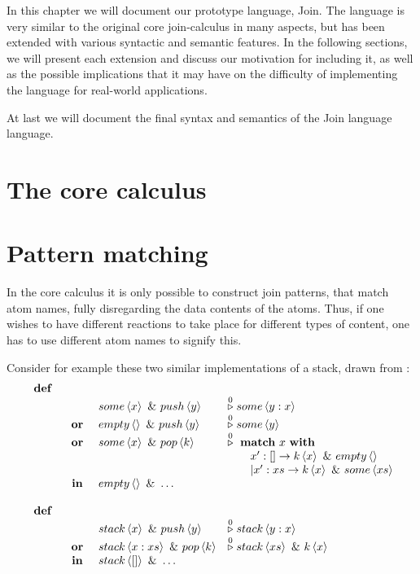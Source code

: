 
In this chapter we will document our prototype language, Join.  The
language is very similar to the original core join-calculus in many
aspects, but has been extended with various syntactic and semantic
features. In the following sections, we will present each extension
and discuss our motivation for including it, as well as the possible
implications that it may have on the difficulty of implementing the
language for real-world applications.

At last we will document the final syntax and semantics of the Join
language language.

\section{The core calculus}

\section{Pattern matching}
In the core calculus it is only possible to construct join patterns, that match
atom names, fully disregarding the data contents of the atoms. Thus, if one wishes
to have different reactions to take place for different types of content, one
has to use different atom names to signify this.

Consider for example these two similar implementations of a stack, drawn from \cite{MaMa2008AlgPat} :
\begin{displaymath}
\begin{array}{rcll}
\defJ
\\ & &  \atm some<x> \andJ \atm push<y>&\toJ0 \atm some<y:x>
\\ &\orJ&\atm empty<> \andJ \atm push<y> &\toJ0 \atm some<y>
\\ &\orJ&\atm some<x> \andJ \atm pop<k> &\toJ0  \match x \with
\\ &&& \qquad         x':[] \to \atm k<x> \andJ \atm empty<>
\\ &&& \qquad    | x':xs \to \atm k<x> \andJ \atm some<xs>
\\&\inJ& \atm empty<> \andJ \ldots
\\
\\\defJ &&&
\\ & &   \atm stack<x> \andJ \atm push<y> &\toJ0 \atm stack<y:x>
\\&\orJ&  \atm stack<x:xs> \andJ \atm pop<k>& \toJ0 \atm stack<xs> \andJ \atm k<x>
\\&\inJ& \atm stack<[]> \andJ \ldots
\end{array}
\end{displaymath}

